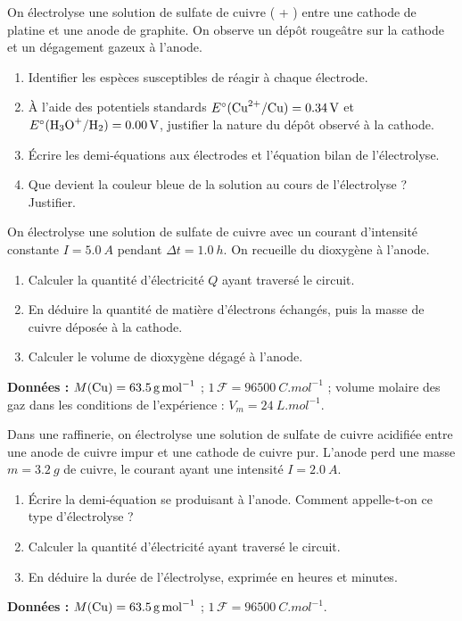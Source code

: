 \documentclass[11pt]{article}
\begin{document}
\begin{exercice}
On électrolyse une solution de sulfate de cuivre ( + ) entre une cathode de platine et une anode de graphite. On observe un dépôt rougeâtre sur la cathode et un dégagement gazeux à l'anode.
\begin{enumerate}
\item Identifier les espèces susceptibles de réagir à chaque électrode.
\item À l'aide des potentiels standards $E^\circ(\ce{Cu^2+}/\ce{Cu}) = \SI{0,34}{V}$ et $E^\circ(\ce{H3O+}/\ce{H2}) = \SI{0,00}{V}$, justifier la nature du dépôt observé à la cathode.
\item Écrire les demi-équations aux électrodes et l'équation bilan de l'électrolyse.
\item Que devient la couleur bleue de la solution au cours de l'électrolyse ? Justifier.
\end{enumerate}
\end{exercice}

\begin{exercice}
On électrolyse une solution de sulfate de cuivre avec un courant d'intensité constante $I = \SI{5,0}{A}$ pendant $\Delta t = \SI{1,0}{h}$. On recueille du dioxygène à l'anode.
\begin{enumerate}
\item Calculer la quantité d'électricité $Q$ ayant traversé le circuit.
\item En déduire la quantité de matière d'électrons échangés, puis la masse de cuivre déposée à la cathode.
\item Calculer le volume de dioxygène dégagé à l'anode.
\end{enumerate}
\textbf{Données :} $M(\ce{Cu}) = \SI{63,5}{g.mol^{-1}}$ ; $1\,\mathcal{F} = \SI{96500}{C.mol^{-1}}$ ; volume molaire des gaz dans les conditions de l'expérience : $V_m = \SI{24}{L.mol^{-1}}$.
\end{exercice}

\begin{exercice}
Dans une raffinerie, on électrolyse une solution de sulfate de cuivre acidifiée entre une anode de cuivre impur et une cathode de cuivre pur. L'anode perd une masse $m = \SI{3,2}{g}$ de cuivre, le courant ayant une intensité $I = \SI{2,0}{A}$.
\begin{enumerate}
\item Écrire la demi-équation se produisant à l'anode. Comment appelle-t-on ce type d'électrolyse ?
\item Calculer la quantité d'électricité ayant traversé le circuit.
\item En déduire la durée de l'électrolyse, exprimée en heures et minutes.
\end{enumerate}
\textbf{Données :} $M(\ce{Cu}) = \SI{63,5}{g.mol^{-1}}$ ; $1\,\mathcal{F} = \SI{96500}{C.mol^{-1}}$.
\end{exercice}
\end{document}
